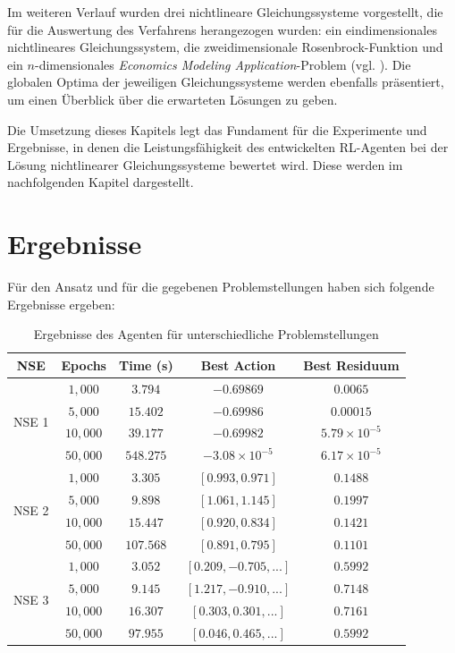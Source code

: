 \documentclass{article}
\theoremstyle{newline}
\begin{document}
\begin{onehalfspace}
Im weiteren Verlauf wurden drei nichtlineare Gleichungssysteme vorgestellt, die für die Auswertung des Verfahrens herangezogen wurden: ein eindimensionales nichtlineares Gleichungssystem, die zweidimensionale Rosenbrock-Funktion und ein $n$-dimensionales \textit{Economics Modeling Application}-Problem (vgl. \cite{CrinaGrosan2008}). Die globalen Optima der jeweiligen Gleichungssysteme werden ebenfalls präsentiert, um einen Überblick über die erwarteten Lösungen zu geben.

Die Umsetzung dieses Kapitels legt das Fundament für die Experimente und Ergebnisse, in denen die Leistungsfähigkeit des entwickelten RL-Agenten bei der Lösung nichtlinearer Gleichungssysteme bewertet wird. Diese werden im nachfolgenden Kapitel dargestellt.

\section{Ergebnisse}

Für den Ansatz und für die gegebenen Problemstellungen haben sich folgende Ergebnisse ergeben:
\smallskip


\begin{table}[h]
	\centering
	\begin{tabular}{c||c|c|c|c}
		\textbf{NSE} & \textbf{Epochs} & \textbf{Time (s)} & \textbf{Best Action} & \textbf{Best Residuum} \\
		\hline
		\multirow{4}{*}{NSE 1} & $1,000$ & $3.794$ & $-0.69869$ & $0.0065$ \\
		& $5,000$ & $15.402$ & $-0.69986$ & $0.00015$ \\
		& $10,000$ & $39.177$ & $-0.69982$ & $5.79 \times 10^{-5}$ \\
		& $50,000$ & $548.275$ & $-3.08 \times 10^{-5}$ & $6.17 \times 10^{-5}$ \\
		\hline
		\multirow{4}{*}{NSE 2} & $1,000$ & $3.305$ & $[0.993, 0.971]$ & $0.1488$ \\
		& $5,000$ & $9.898$ & $[1.061, 1.145]$ & $0.1997$ \\
		& $10,000$ & $15.447$ & $[0.920, 0.834]$ & $0.1421$ \\
		& $50,000$ & $107.568$ & $[0.891, 0.795]$ & $0.1101$ \\
		\hline
		\multirow{4}{*}{NSE 3} & $1,000$ & $3.052$ & $[0.209, -0.705, ...]$ & $0.5992$ \\
		& $5,000$ & $9.145$ & $[1.217, -0.910, ...]$ & $0.7148$ \\
		& $10,000$ & $16.307$ & $[0.303, 0.301, ...]$ & $0.7161$ \\
		& $50,000$ & $97.955$ & $[0.046, 0.465, ...]$ & $0.5992$ \\
	\end{tabular}
	\caption{Ergebnisse des Agenten für unterschiedliche Problemstellungen}
	\label{tab:Ergebnisse}
\end{table}


\end{onehalfspace}
\end{document}
